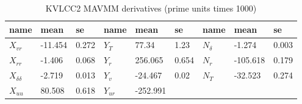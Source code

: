 \begin{table}[h]
    \footnotesize
    \centering
        \caption{KVLCC2 MAVMM derivatives (prime units times 1000)}
    \label{\detokenize{06.20_results_kvlcc2:kvlcc2-derivatives}}
    \begin{tabular}{|T|T|T|T|T|T|T|T|T|}
\hline


name
&

mean
&

se
&

name
&

mean
&

se
&

name
&

mean
&

se
\\
\hline

\( X_{vr} \)
&

-11.454
&

0.272
&

\( Y_{T} \)
&

77.34
&

1.23
&

\( N_{\delta} \)
&

-1.274
&

0.003
\\
\hline

\( X_{rr} \)
&

-1.406
&

0.068
&

\( Y_{r} \)
&

256.065
&

0.654
&

\( N_{r} \)
&

-105.618
&

0.179
\\
\hline

\( X_{\delta\delta} \)
&

-2.719
&

0.013
&

\( Y_{v} \)
&

-24.467
&

0.02
&

\( N_{T} \)
&

-32.523
&

0.274
\\
\hline

\( X_{uu} \)
&

80.508
&

0.618
&

\( Y_{ur} \)
&

-252.991
&


\end{tabular}
\end{table}
